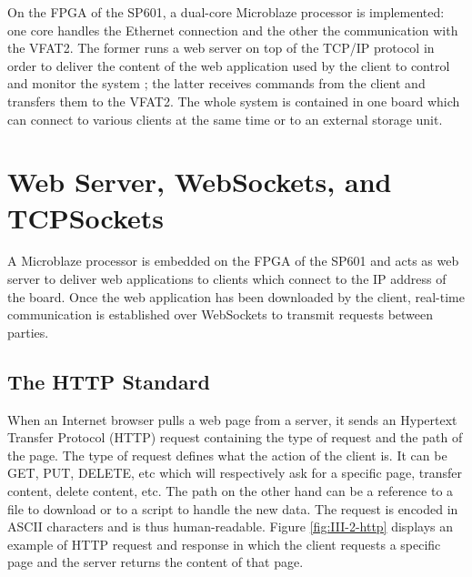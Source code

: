     On the FPGA of the SP601, a dual-core Microblaze processor is implemented: one core handles the Ethernet connection and the other the communication with the VFAT2. The former runs a web server on top of the TCP/IP protocol in order to deliver the content of the web application used by the client to control and monitor the system ; the latter receives commands from the client and transfers them to the VFAT2. The whole system is contained in one board which can connect to various clients at the same time or to an external storage unit.

  \section{Web Server, WebSockets, and TCPSockets}

    A Microblaze processor is embedded on the FPGA of the SP601 and acts as web server to deliver web applications to clients which connect to the IP address of the board. Once the web application has been downloaded by the client, real-time communication is established over WebSockets to transmit requests between parties.

    \subsection{The HTTP Standard}

      When an Internet browser pulls a web page from a server, it sends an Hypertext Transfer Protocol (HTTP) request containing the type of request and the path of the page. The type of request defines what the action of the client is. It can be GET, PUT, DELETE, etc which will respectively ask for a specific page, transfer content, delete content, etc. The path on the other hand can be a reference to a file to download or to a script to handle the new data. The request is encoded in ASCII characters and is thus human-readable. Figure \ref{fig:III-2-http} displays an example of HTTP request and response in which the client requests a specific page and the server returns the content of that page. \\

